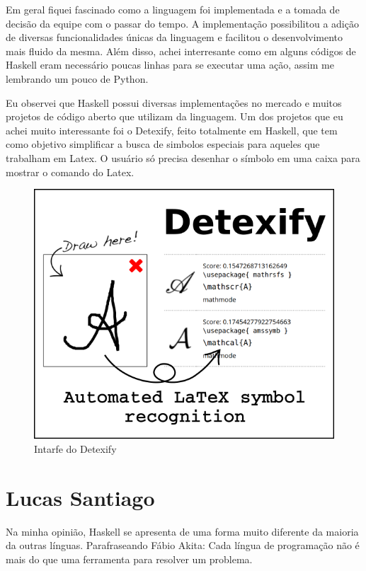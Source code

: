 \documentclass[
  article,			       %
  12pt,				         %
  oneside,			       %
  a4paper,			       %
  english,		       	 %
  brazil,			      	 %
  sumario=tradicional
]{abntex2}
\begin{document}
\begin{apendicesenv}
        Em geral fiquei fascinado como a linguagem foi implementada e a tomada de decisão da equipe com o passar do tempo. A implementação
        possibilitou a adição de diversas funcionalidades únicas da linguagem e facilitou o desenvolvimento mais fluido da mesma.
        Além disso, achei interresante como em alguns códigos de Haskell eram necessário poucas linhas para se executar uma ação, assim
        me lembrando um pouco de Python.

        Eu observei que Haskell possui diversas implementações no mercado e muitos projetos de código aberto que utilizam da linguagem.
        Um dos projetos que eu achei muito interessante foi o Detexify, feito totalmente em Haskell, que tem como objetivo simplificar a 
        busca de simbolos especiais para aqueles que trabalham em Latex. O usuário só precisa desenhar o símbolo em uma caixa para mostrar 
        o comando do Latex.
        
        \begin{figure}[ht]
          \includegraphics[width =\textwidth]{detexify.png}
          \caption{Intarfe do Detexify}
        \end{figure}
        
        \newpage 

        \chapter{Lucas Santiago}

        Na minha opinião, Haskell se apresenta de uma forma muito diferente da maioria da outras línguas. 
        Parafraseando Fábio Akita: Cada língua de programação não é mais do que uma ferramenta
        para resolver um problema. 


\end{apendicesenv}
\end{document}
